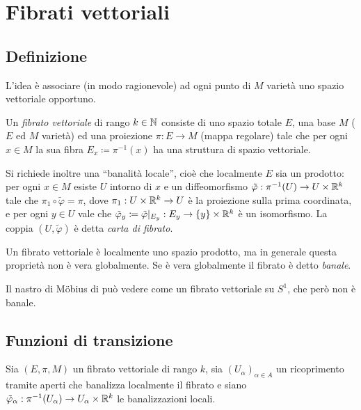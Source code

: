 \chapter{Fibrati vettoriali} %

\section{Definizione} %

L'idea è associare (in modo ragionevole) ad ogni punto di $M$ varietà uno spazio vettoriale opportuno.

\begin{definition} 
	Un \emph{fibrato vettoriale} di rango $k\in\mathbb N$ consiste di uno spazio totale $E$, una base $M$ ($E$ ed $M$ varietà) ed una proiezione $\pi:E\to M$ (mappa regolare) tale che per ogni $x\in M$ la sua fibra $E_x\coloneqq \pi^{-1}(x)$ ha una struttura di spazio vettoriale.
	
	Si richiede inoltre una ``banalità locale'', cioè che localmente $E$ sia un prodotto: per ogni $x\in M$ esiste $U$ intorno di $x$ e un diffeomorfismo $\tilde\varphi:\pi^{-1}(U)\to U\times \mathbb R^k$ tale che $\pi_1\circ \tilde\varphi = \pi$, dove $\pi_1:U\times \mathbb R^k\to U$ è la proiezione sulla prima coordinata, e per ogni $y\in U$ vale che $\tilde\varphi_y\coloneqq \tilde\varphi|_{E_y}:E_y\to \{y\}\times \mathbb R^k$ è un isomorfismo.
	La coppia $(U,\tilde\varphi)$ è detta \emph{carta di fibrato}.
\end{definition}

\begin{remark}
	Un fibrato vettoriale è localmente uno spazio prodotto, ma in generale questa proprietà non è vera globalmente. Se è vera globalmente il fibrato è detto \emph{banale}.
\end{remark}

\begin{example} 
	Il nastro di M\"obius di può vedere come un fibrato vettoriale su $S^1$, che però non è banale.
\end{example}

\section{Funzioni di transizione}

Sia $(E,\pi, M)$ un fibrato vettoriale di rango $k$, sia $(U_\alpha)_{\alpha\in A}$ un ricoprimento tramite aperti che banalizza localmente il fibrato e siano $\tilde\varphi_\alpha:\pi^{-1}(U_\alpha)\to U_\alpha\times \mathbb R^k$ le banalizzazioni locali.

